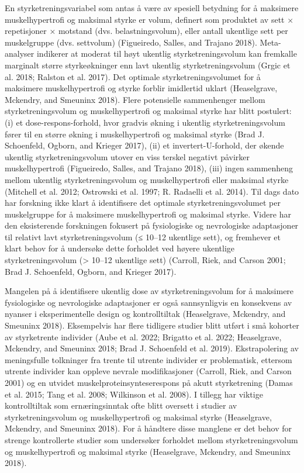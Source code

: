 \documentclass[
  letterpaper,
  DIV=11,
  numbers=noendperiod]{scrreprt}
\begin{document}
En styrketreningsvariabel som antas å være av spesiell betydning for å
maksimere muskelhypertrofi og maksimal styrke er volum, definert som
produktet av sett × repetisjoner × motstand (dvs. belastningsvolum),
eller antall ukentlige sett per muskelgruppe (dvs. settvolum)
(Figueiredo, Salles, and Trajano 2018). Meta-analyser indikerer at
moderat til høyt ukentlig styrketreningsvolum kan fremkalle marginalt
større styrkeøkninger enn lavt ukentlig styrketreningsvolum (Grgic et
al. 2018; Ralston et al. 2017). Det optimale styrketreningsvolumet for å
maksimere muskelhypertrofi og styrke forblir imidlertid uklart
(Heaselgrave, Mckendry, and Smeuninx 2018). Flere potensielle
sammenhenger mellom styrketreningsvolum og muskelhypertrofi og maksimal
styrke har blitt postulert: (i) et dose-respons-forhold, hvor gradvis
økning i ukentlig styrketreningsvolum fører til en større økning i
muskelhypertrofi og maksimal styrke (Brad J. Schoenfeld, Ogborn, and
Krieger 2017), (ii) et invertert-U-forhold, der økende ukentlig
styrketreningsvolum utover en viss terskel negativt påvirker
muskelhypertrofi (Figueiredo, Salles, and Trajano 2018), (iii) ingen
sammenheng mellom ukentlig styrketreningsvolum og muskelhypertrofi eller
maksimal styrke (Mitchell et al. 2012; Ostrowski et al. 1997; R.
Radaelli et al. 2014). Til dags dato har forskning ikke klart å
identifisere det optimale styrketreningsvolumet per muskelgruppe for å
maksimere muskelhypertrofi og maksimal styrke. Videre har den
eksisterende forskningen fokusert på fysiologiske og nevrologiske
adaptasjoner til relativt lavt styrketreningsvolum (≤ 10--12 ukentlige
sett), og fremhever et klart behov for å undersøke dette forholdet ved
høyere ukentlige styrketreningsvolum (\textgreater{} 10--12 ukentlige
sett) (Carroll, Riek, and Carson 2001; Brad J. Schoenfeld, Ogborn, and
Krieger 2017).

Mangelen på å identifisere ukentlig dose av styrketreningsvolum for å
maksimere fysiologiske og nevrologiske adaptasjoner er også
sannsynligvis en konsekvens av nyanser i eksperimentelle design og
kontrolltiltak (Heaselgrave, Mckendry, and Smeuninx 2018). Eksempelvis
har flere tidligere studier blitt utført i små kohorter av styrketrente
individer (Aube et al. 2022; Brigatto et al. 2022; Heaselgrave,
Mckendry, and Smeuninx 2018; Brad J. Schoenfeld et al. 2019).
Ekstrapolering av meningsfulle tolkninger fra trente til utrente
individer er problematisk, ettersom utrente individer kan oppleve
nevrale modifikasjoner (Carroll, Riek, and Carson 2001) og en utvidet
muskelproteinsynteserespons på akutt styrketrening (Damas et al. 2015;
Tang et al. 2008; Wilkinson et al. 2008). I tillegg har viktige
kontrolltiltak som ernæringsinntak ofte blitt oversett i studier av
styrketreningsvolum og muskelhypertrofi og maksimal styrke (Heaselgrave,
Mckendry, and Smeuninx 2018). For å håndtere disse manglene er det behov
for strenge kontrollerte studier som undersøker forholdet mellom
styrketreningsvolum og muskelhypertrofi og maksimal styrke (Heaselgrave,
Mckendry, and Smeuninx 2018).
\end{document}
